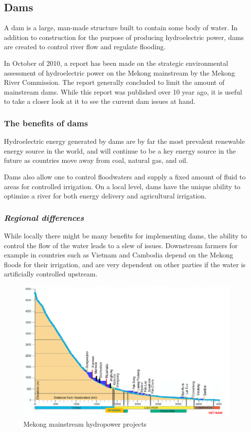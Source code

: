 \newpage
\subsection{Dams}
A dam is a large, man-made structure built to contain some body of water. In addition to construction for the purpose of producing hydroelectric power, dams are created to control river flow and regulate flooding.

In October of 2010, a report has been made on the strategic environmental assessment of hydroelectric power on the Mekong mainstream by the Mekong River Commission.\cite{mrc} The report generally concluded to limit the amount of mainstream dams. While this report was published over 10 year ago, it is useful to take a closer look at it to see the current dam issues at hand.

\subsubsection{The benefits of dams}
Hydroelectric energy generated by dams are by far the most prevalent renewable energy source in the world, and will continue to be a key energy source in the future as countries move away from coal, natural gas, and oil.

Dams also allow one to control floodwaters and supply a fixed amount of fluid to areas for controlled irrigation. On a local level, dams have the unique ability to optimize a river for both energy delivery and agricultural irrigation.

\subsubsection{\textit{Regional differences}}
While locally there might be many benefits for implementing dams, the ability to control the flow of the water leads to a slew of issues. Downstream farmers for example in countries such as Vietnam and Cambodia depend on the Mekong floods for their irrigation, and are very dependent on other parties if the water is artificially controlled upstream. 

\begin{figure}[h]
\centering
\includegraphics[scale=0.55]{mekong/11_proposed.png}
\caption{Mekong mainstream hydropower projects \cite{mrc}}
\end{figure}

